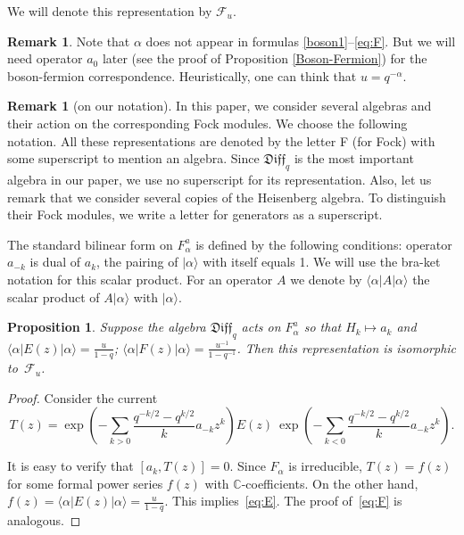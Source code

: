 \documentclass[11pt]{article}
\numberwithin{equation}{section}
\newtheorem{Proposition}[Theorem]{Proposition}
\theoremstyle{definition}
\newtheorem{Remark}[Theorem]{Remark}
\newcommand{\valpha}{| \alpha \rangle}
\newcommand{\qD}{\mathfrak{Diff}_q}
\begin{document}
We will denote this representation by $\mathcal{F}_u$.

\begin{Remark} \label{remark:NOalpha}Note that $\alpha$ does not appear in formulas \eqref{boson1}--\eqref{eq:F}. But we will need operator $a_0$ later (see the proof of Proposition \ref{Boson-Fermion}) for the boson-fermion correspondence. Heuristically, one can think that $u = q^{-\alpha}$.
\end{Remark}

\begin{Remark}[on our notation]In this paper, we consider several algebras and their action on the corresponding Fock modules. We choose the following notation. All these representations are denoted by the letter F (for Fock) with some superscript to mention an algebra. Since $\qD$ is the most important algebra in our paper, we use no superscript for its representation.
Also, let us remark that we consider several copies of the Heisenberg algebra. To distinguish their Fock modules, we write a letter for generators as a superscript.
\end{Remark}

The standard bilinear form on $F^a_{\alpha}$ is defined by the following conditions: operator $a_{-k}$ is dual of $a_k$, the pairing of $\valpha$ with itself equals 1. We will use the bra-ket notation for this scalar product. For an operator $A$ we denote by $\langle \alpha | A | \alpha \rangle$ the scalar product of $A | \alpha \rangle$ with $\valpha$.

\begin{Proposition}\label{Fock} Suppose the algebra $\qD$ acts on $F^a_{\alpha}$ so that $H_k \mapsto a_k$ and $\langle \alpha | E(z) | \alpha \rangle = \frac{u}{1-q}$; $\langle \alpha | F(z) | \alpha \rangle = \frac{u^{-1}}{1-q^{-1}}$.
Then this representation is isomorphic to~$\mathcal{F}_u$.
\end{Proposition}

\begin{proof} Consider the current \[T(z) =\exp \! \left( - \sum_{k>0} \frac{q^{-k/2}-q^{k/2}}{k} a_{-k} z^k \right) E(z) \ \exp \! \left( - \sum_{k<0}\frac{q^{-k/2}-q^{k/2}}{k} a_{-k} z^k \right).\]

It is easy to verify that $[a_k, T(z)] =0$. Since $F_{\alpha}$ is irreducible, $T(z)= f(z)$ for some formal power series $f(z)$ with $\mathbb{C}$-coefficients. On the other hand, $f(z) = \langle \alpha | E(z) | \alpha \rangle = \frac{u}{1-q} $. This implies~\eqref{eq:E}. The proof of~\eqref{eq:F} is analogous.
\end{proof}
\end{document}
